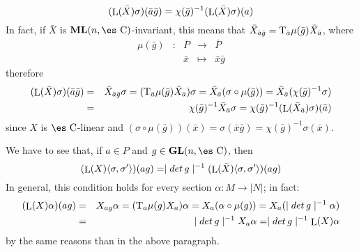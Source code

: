\documentclass[12pt]{article}
\def\beann{\begin{eqnarray*}}
\def\eeann{\end{eqnarray*}}
\def\GL{{\bf GL}(n,\Complex )}
\def\ML{{\bf ML}(n,\Complex )}
\def\Complex{\mbox{\es C}}
\def\Tan{{\rm T}}
\def\Lie{\mathop{\rm L}\nolimits}
\begin{document}
$$
(\Lie(\bar X) \sigma )(\bar a \bar g) =
\chi (\bar g)^{-1} (\Lie(\bar X) \sigma )(a)
$$
In fact, if $\bar X$ is $\ML$-invariant, this means that
$\bar X_{\bar a \bar g} = \Tan_{\bar a} \mu (\bar g) \bar X_{\bar a}$,
where
$$
\begin{array}{ccccc}
\mu (\bar g) &:& \bar P & \to & \bar P
\\
& & \bar x & \mapsto & \bar x \bar g
\end{array}
$$
therefore
\beann
(\Lie(\bar X) \sigma )(\bar a \bar g)
&=&
\bar X_{\bar a \bar g} \sigma =
(\Tan_{\bar a} \mu (\bar g) \bar X_{\bar a}) \sigma =
\bar X_{\bar a} (\sigma \circ \mu (\bar g)) =
\bar X_{\bar a} (\chi (\bar g)^{-1}\sigma )
\\ &=&
\chi (\bar g)^{-1} \bar X_{\bar a} \sigma =
\chi (\bar g)^{-1} (\Lie(\bar X_{\bar a})\sigma)(\bar a)
\eeann
since $X$ is $\Complex$-linear and
$(\sigma \circ \mu (\bar g))(\bar x) =
\sigma (\bar x \bar g) = \chi (\bar g)^{-1}\sigma (\bar x)$.

\quad {} \quad
We have to see that, if $a \in P$ and $g \in \GL$, then
$$
(\Lie(X) \langle \sigma ,\sigma ' \rangle)(ag) =
\mid det\, g \mid^{-1} (\Lie(\bar X) \langle \sigma ,\sigma '
\rangle)(ag)
$$
In general, this condition holds for every section
$\alpha : M \to | N |$; in fact:
\beann
(\Lie(X)\alpha)(ag) & = & X_{ag} \alpha = (\Tan_a \mu (g) X_a) \alpha =
X_a (\alpha \circ \mu (g)) =X_a (\mid det\, g \mid^{-1} \alpha )
\\ & = &
\mid det\, g \mid^{-1} X_a \alpha = \mid det\, g \mid^{-1} \Lie(X)
\alpha \eeann by the same reasons than in the above paragraph.
\end{document}
